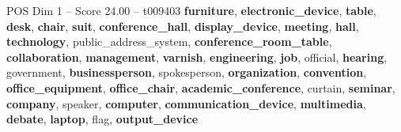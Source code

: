 \begin{textsample}{POS Dim 1 – Score 24.00 – t009403}  \label{ex:f1_pos_027}
\textbf{furniture}, \textbf{electronic\_device}, \textbf{table}, \textbf{desk}, \textbf{chair}, \textbf{suit}, \textbf{conference\_hall}, \textbf{display\_device}, \textbf{meeting}, \textbf{hall}, \textbf{technology}, public\_address\_system, \textbf{conference\_room\_table}, \textbf{collaboration}, \textbf{management}, \textbf{varnish}, \textbf{engineering}, \textbf{job}, official, \textbf{hearing}, government, \textbf{businessperson}, spokesperson, \textbf{organization}, \textbf{convention}, \textbf{office\_equipment}, \textbf{office\_chair}, \textbf{academic\_conference}, curtain, \textbf{seminar}, \textbf{company}, speaker, \textbf{computer}, \textbf{communication\_device}, \textbf{multimedia}, \textbf{debate}, \textbf{laptop}, flag, \textbf{output\_device}

\end{textsample}
